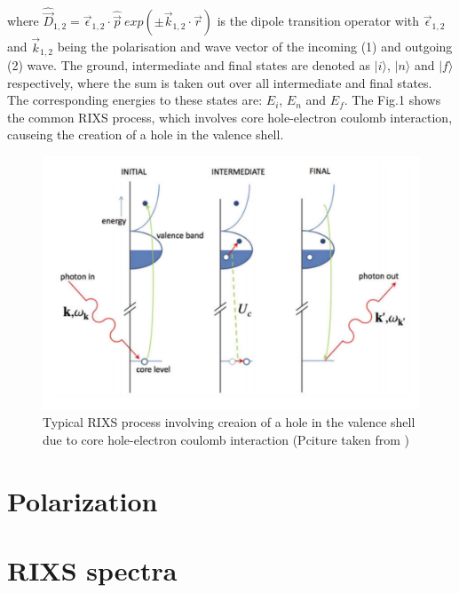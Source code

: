 \documentclass[twoside,twocolumn, elsart]{article}
\begin{document}
\noindent where $\hat{\vec{D}}_{1,2} = \vec{\epsilon}_{1,2}\cdot\hat{\vec{p}}~exp(\pm \vec{k}_{1,2} \cdot \vec{r})$ is the dipole transition operator with $\vec{\epsilon}_{1,2}$ and $\vec{k}_{1,2}$ being the polarisation and wave vector of the incoming (1) and outgoing (2) wave. The ground, intermediate and final states are denoted as $|i\rangle$, $|n\rangle$ and $|f\rangle$ respectively, where the sum is taken out over all intermediate and final states. The corresponding energies to these states are: $E_i$, $E_n$ and $E_f$. The Fig.1 shows the common RIXS process, which involves core hole-electron coulomb interaction, causeing the creation of a hole in the valence shell.

\begin{figure}
    \begin{minipage}[!tb]{\columnwidth}
	\includegraphics[width=\columnwidth]{Graphics/RIXSprocess.pdf}
	\caption{Typical RIXS process involving creaion of a hole in the valence shell due to core hole-electron coulomb interaction \cite{GuarisePhD} (Pciture taken from \cite{GuarisePhD})}
	\label{fig: RIXSprocess}
    \end{minipage}
\end{figure}
\section{Polarization}

\section{RIXS spectra}
\end{document}
